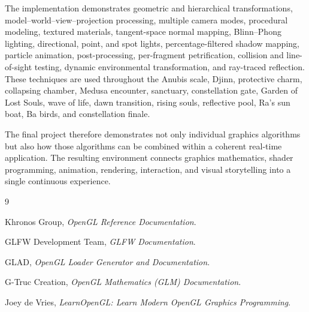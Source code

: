 \documentclass[11pt,a4paper]{article}
\begin{document}
The implementation demonstrates geometric and hierarchical transformations,
model--world--view--projection processing, multiple camera modes, procedural
modeling, textured materials, tangent-space normal mapping, Blinn--Phong
lighting, directional, point, and spot lights, percentage-filtered shadow
mapping, particle animation, post-processing, per-fragment petrification,
collision and line-of-sight testing, dynamic environmental transformation, and
ray-traced reflection. These techniques are used throughout the Anubis scale,
Djinn, protective charm, collapsing chamber, Medusa encounter, sanctuary,
constellation gate, Garden of Lost Souls, wave of life, dawn transition, rising
souls, reflective pool, Ra's sun boat, Ba birds, and constellation finale.

The final project therefore demonstrates not only individual graphics
algorithms but also how those algorithms can be combined within a coherent
real-time application. The resulting environment connects graphics mathematics,
shader programming, animation, rendering, interaction, and visual storytelling
into a single continuous experience.



\begin{thebibliography}{9}

Khronos Group,
\textit{OpenGL Reference Documentation}.

GLFW Development Team,
\textit{GLFW Documentation}.

GLAD,
\textit{OpenGL Loader Generator and Documentation}.

G-Truc Creation,
\textit{OpenGL Mathematics (GLM) Documentation}.

Joey de Vries,
\textit{LearnOpenGL: Learn Modern OpenGL Graphics Programming}.

\end{thebibliography}
\end{document}
